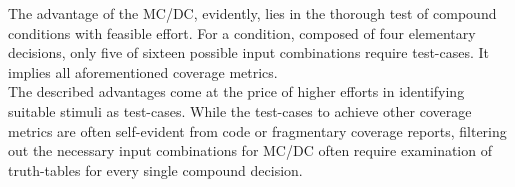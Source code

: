 	The advantage of the MC/DC, evidently, lies in the thorough test of compound conditions with feasible effort. For a condition, composed of four elementary decisions, only five of sixteen possible input combinations require test-cases. It implies all aforementioned coverage metrics. \\
	The described advantages come at the price of higher efforts in identifying suitable stimuli as test-cases. While the test-cases to achieve other coverage metrics are often self-evident from code or fragmentary coverage reports, filtering out the necessary input combinations for MC/DC often require examination of truth-tables for every single compound decision.
	
	
	
	
